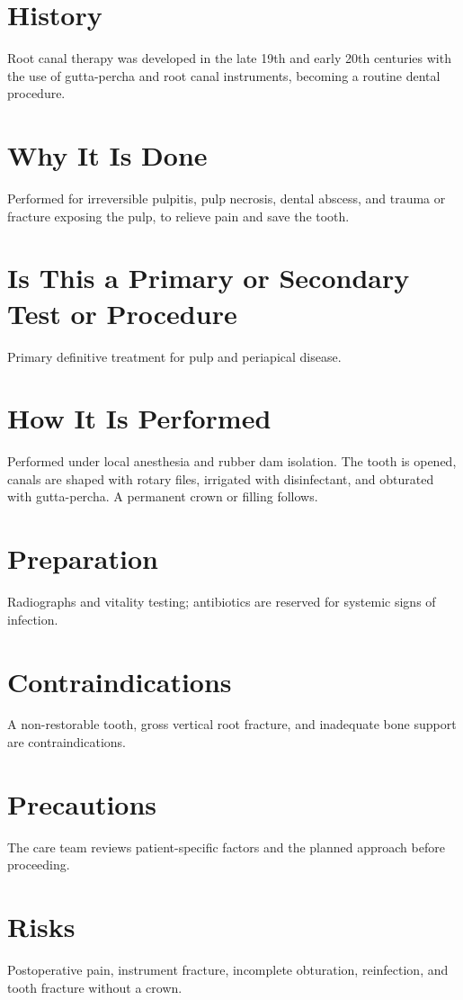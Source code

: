 \section*{History}
Root canal therapy was developed in the late 19th and early 20th centuries with the use of gutta-percha and root canal instruments, becoming a routine dental procedure.

\section*{Why It Is Done}
Performed for irreversible pulpitis, pulp necrosis, dental abscess, and trauma or fracture exposing the pulp, to relieve pain and save the tooth.

\section*{Is This a Primary or Secondary Test or Procedure}
Primary definitive treatment for pulp and periapical disease.

\section*{How It Is Performed}
Performed under local anesthesia and rubber dam isolation. The tooth is opened, canals are shaped with rotary files, irrigated with disinfectant, and obturated with gutta-percha. A permanent crown or filling follows.

\section*{Preparation}
Radiographs and vitality testing; antibiotics are reserved for systemic signs of infection.

\section*{Contraindications}
A non-restorable tooth, gross vertical root fracture, and inadequate bone support are contraindications.

\section*{Precautions}
The care team reviews patient-specific factors and the planned approach before proceeding.

\section*{Risks}
Postoperative pain, instrument fracture, incomplete obturation, reinfection, and tooth fracture without a crown.


